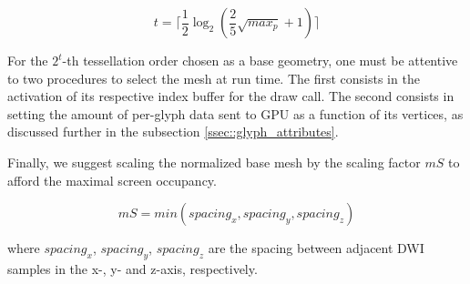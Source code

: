 \documentclass[twoside,twocolumn,10pt]{article}
\begin{document}
\begin{equation}
\label{eq::icosa_order}
     t = \lceil \frac{1}{2}\log_2{(\frac{2}{5}\sqrt{max_p} + 1)} \rceil
\end{equation}









For the $2^t$-th tessellation order chosen as a base geometry, one must be attentive to two procedures to select the mesh at run time. The first consists in the activation of its respective index buffer for the draw call. The second consists in setting the amount of per-glyph data sent to GPU as a function of its vertices, as discussed further in the subsection \ref{ssec::glyph_attributes}.

Finally, we suggest scaling the normalized base mesh by the scaling factor $mS$ to afford the maximal screen occupancy.

\begin{equation}
\label{eq:spacings}
mS = min(spacing_x, spacing_y, spacing_z)
\end{equation}

where $spacing_x$, $spacing_y$, $spacing_z$ are the spacing between adjacent DWI samples in the x-, y- and z-axis, respectively.
\end{document}
